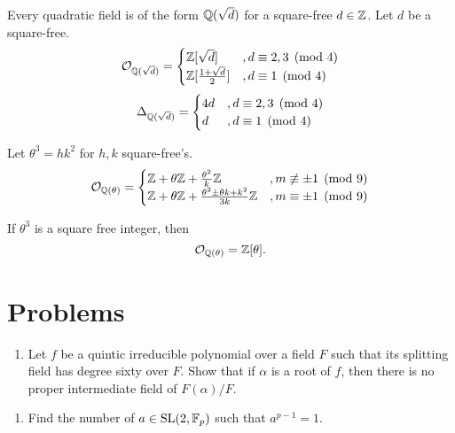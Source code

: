 \documentclass{../../large}
\begin{document}
\begin{prb}
Every quadratic field is of the form $\mathbb{Q}(\sqrt d)$ for a square-free $d\in\mathbb{Z}$.
Let $d$ be a square-free.
\[\mathcal{O}_{\mathbb{Q}(\sqrt d)}=\begin{cases}\mathbb{Z}[\sqrt d]&,d\equiv2,3\pmod4\\\mathbb{Z}[\tfrac{1+\sqrt d}2]&,d\equiv1\pmod4\end{cases}\]
\[\Delta_{\mathbb{Q}(\sqrt d)}=\begin{cases}4d&,d\equiv2,3\pmod4\\ d&,d\equiv1\pmod4\end{cases}\]
\end{prb}

\begin{prb}
\begin{parts}
\item
Let $\theta^3=hk^2$ for $h,k$ square-free's.
\[\mathcal{O}_{\mathbb{Q}(\theta)}=\begin{cases}\mathbb{Z}+\theta\mathbb{Z}+\frac{\theta^2}k\mathbb{Z}&,m\not\equiv\pm1\pmod9\\
\mathbb{Z}+\theta\mathbb{Z}+\frac{\theta^2\pm\theta k+k^2}{3k}\mathbb{Z}&,m\equiv\pm1\pmod9\end{cases}\]
\item
If $\theta^3$ is a square free integer, then
\[\mathcal{O}_{\mathbb{Q}(\theta)}=\mathbb{Z}[\theta].\]
\end{parts}
\end{prb}







\section*{Problems}

\begin{enumerate}
\item Let $f$ be a quintic irreducible polynomial over a field $F$ such that its splitting field has degree sixty over $F$. Show that if $\alpha$ is a root of $f$, then there is no proper intermediate field of $F(\alpha)/F$.
\end{enumerate}




\begin{enumerate}
\item Find the number of $a\in\mathrm{SL}(2,\mathbb{F}_p)$ such that $a^{p-1}=1$.
\end{enumerate}
\end{document}
